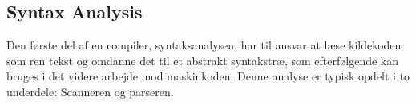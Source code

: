 \subsection{Syntax Analysis}\label{ssec:syntaxanalysis}
Den første del af en compiler, syntaksanalysen, har til ansvar at læse kildekoden som ren tekst og omdanne det til et abstrakt syntakstræ, som efterfølgende kan bruges i det videre arbejde mod maskinkoden. Denne analyse er typisk opdelt i to underdele: Scanneren og parseren. 